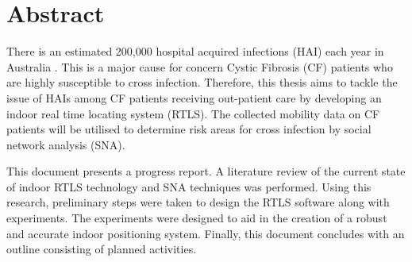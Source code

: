 \chapter*{Abstract}\label{abstract}
There is an estimated 200,000 hospital acquired infections (HAI) each year in Australia \cite{ausHAI}. This is a major cause for concern Cystic Fibrosis (CF) patients who are highly susceptible to cross infection. Therefore, this thesis aims to tackle the issue of HAIs among CF patients receiving out-patient care by developing an indoor real time locating system (RTLS). The collected mobility data on CF patients will be utilised to determine risk areas for cross infection by social network analysis (SNA).

This document presents a progress report. A literature review of the current state of indoor RTLS technology and SNA techniques was performed. Using this research, preliminary steps were taken to design the RTLS software along with experiments. The experiments were designed to aid in the creation of a robust and accurate indoor positioning system. Finally, this document concludes with an outline consisting of planned activities. 

\begin{comment}
What? 
What did the researcher do in their research?

Why? 
What were the reasons for doing the research? What questions was the researcher trying to answer?

How?
How did the researcher go about finding out the answers? What methods did they use?

What?
What did the researcher find out? What were the key results?

Why?
Why are these results important? What is their significance?
\end{comment}